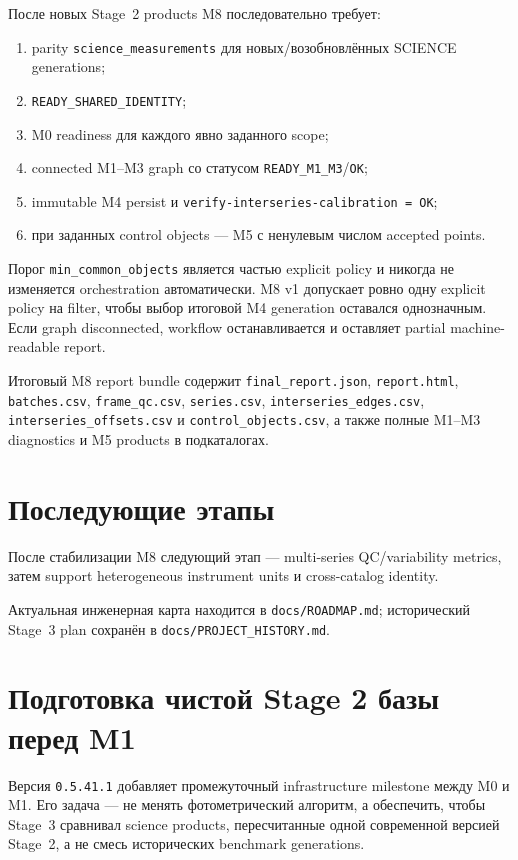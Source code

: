 После новых Stage~2 products M8 последовательно требует:
\begin{enumerate}
  \item parity \texttt{science\_measurements} для новых/возобновлённых SCIENCE generations;
  \item \texttt{READY\_SHARED\_IDENTITY};
  \item M0 readiness для каждого явно заданного scope;
  \item connected M1--M3 graph со статусом \texttt{READY\_M1\_M3}/\texttt{OK};
  \item immutable M4 persist и \texttt{verify-interseries-calibration = OK};
  \item при заданных control objects --- M5 с ненулевым числом accepted points.
\end{enumerate}

Порог \texttt{min\_common\_objects} является частью explicit policy и никогда не изменяется orchestration автоматически. M8 v1 допускает ровно одну explicit policy на filter, чтобы выбор итоговой M4 generation оставался однозначным. Если graph disconnected, workflow останавливается и оставляет partial machine-readable report.

Итоговый M8 report bundle содержит \texttt{final\_report.json}, \texttt{report.html}, \texttt{batches.csv}, \texttt{frame\_qc.csv}, \texttt{series.csv}, \texttt{interseries\_edges.csv}, \texttt{interseries\_offsets.csv} и \texttt{control\_objects.csv}, а также полные M1--M3 diagnostics и M5 products в подкаталогах.

\section{Последующие этапы}

После стабилизации M8 следующий этап --- multi-series QC/variability metrics, затем support heterogeneous instrument units и cross-catalog identity.

Актуальная инженерная карта находится в \texttt{docs/ROADMAP.md}; исторический Stage~3 plan сохранён в \texttt{docs/PROJECT\_HISTORY.md}.

\section{Подготовка чистой Stage 2 базы перед M1}

Версия \texttt{0.5.41.1} добавляет промежуточный infrastructure milestone между M0 и M1. Его задача --- не менять фотометрический алгоритм, а обеспечить, чтобы Stage~3 сравнивал science products, пересчитанные одной современной версией Stage~2, а не смесь исторических benchmark generations.

